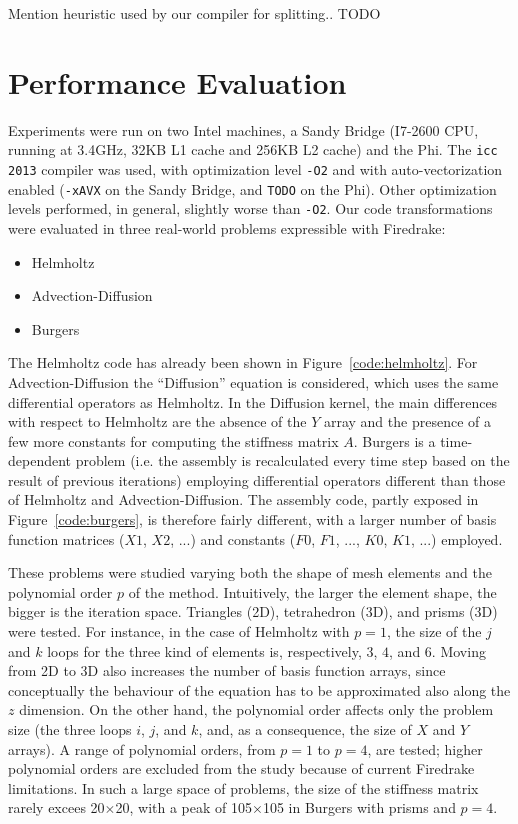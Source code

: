 \documentclass[conference]{IEEEtran}
\begin{document}
Mention heuristic used by our compiler for splitting.. TODO


\section{Performance Evaluation}
\label{sec:perf-results}

Experiments were run on two Intel machines, a Sandy Bridge (I7-2600 CPU, running at 3.4GHz, 32KB L1 cache and 256KB L2 cache) and the Phi. The \texttt{icc 2013} compiler was used, with optimization level \texttt{-O2} and with auto-vectorization enabled (\texttt{-xAVX} on the Sandy Bridge, and \texttt{TODO} on the Phi). Other optimization levels performed, in general, slightly worse than \texttt{-O2}. Our code transformations were evaluated in three real-world problems expressible with Firedrake:
\begin{itemize}
\item Helmholtz
\item Advection-Diffusion
\item Burgers
\end{itemize}
The Helmholtz code has already been shown in Figure~\ref{code:helmholtz}. For Advection-Diffusion the ``Diffusion'' equation is considered, which uses the same differential operators as Helmholtz. In the Diffusion kernel, the main differences with respect to Helmholtz are the absence of the $Y$ array and the presence of a few more constants for computing the stiffness matrix $A$. Burgers is a time-dependent problem (i.e. the assembly is recalculated every time step based on the result of previous iterations) employing differential operators different than those of Helmholtz and Advection-Diffusion. The assembly code, partly exposed in Figure~\ref{code:burgers}, is therefore fairly different, with a larger number of basis function matrices ($X1$, $X2$, ...) and constants ($F0$, $F1$, ..., $K0$, $K1$, ...) employed. 

These problems were studied varying both the shape of mesh elements and the polynomial order $p$ of the method. Intuitively, the larger the element shape, the bigger is the iteration space. Triangles (2D), tetrahedron (3D), and prisms (3D) were tested. For instance, in the case of Helmholtz with $p=1$, the size of the $j$ and $k$ loops for the three kind of elements is, respectively, $3$, $4$, and $6$. Moving from 2D to 3D also increases the number of basis function arrays, since conceptually the behaviour of the equation has to be approximated also along the $z$ dimension. On the other hand, the polynomial order affects only the problem size (the three loops $i$, $j$, and $k$, and, as a consequence, the size of $X$ and $Y$ arrays). A range of polynomial orders, from $p=1$ to $p=4$, are tested; higher polynomial orders are excluded from the study because of current Firedrake limitations. In such a large space of problems, the size of the stiffness matrix rarely excees 20$\times$20, with a peak of 105$\times$105 in Burgers with prisms and $p=4$. 
\end{document}
